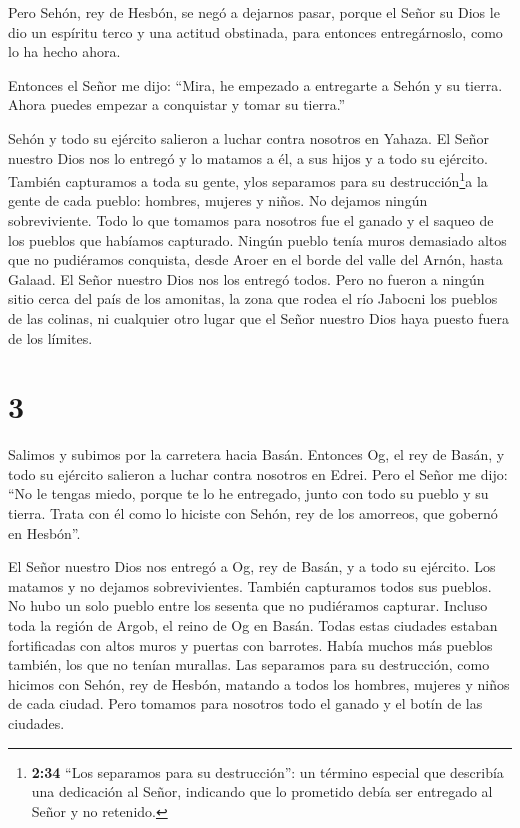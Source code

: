  Pero Sehón, rey de Hesbón, se negó a dejarnos pasar,
porque el Señor su Dios le dio un espíritu terco y una actitud
obstinada, para entonces entregárnoslo, como lo ha hecho ahora.

 Entonces el Señor me dijo: ``Mira, he empezado a
entregarte a Sehón y su tierra. Ahora puedes empezar a conquistar y
tomar su tierra.''

 Sehón y todo su ejército salieron a luchar contra nosotros
en Yahaza.  El Señor nuestro Dios nos lo entregó y lo
matamos a él, a sus hijos y a todo su ejército.  También
capturamos a toda su gente, ylos separamos para su
destrucción\footnote{\textbf{2:34} ``Los separamos para su
  destrucción'': un término especial que describía una dedicación al
  Señor, indicando que lo prometido debía ser entregado al Señor y no
  retenido.}a la gente de cada pueblo: hombres, mujeres y niños. No
dejamos ningún sobreviviente.  Todo lo que tomamos para
nosotros fue el ganado y el saqueo de los pueblos que habíamos
capturado.  Ningún pueblo tenía muros demasiado altos que
no pudiéramos conquista, desde Aroer en el borde del valle del Arnón,
hasta Galaad. El Señor nuestro Dios nos los entregó todos. 
Pero no fueron a ningún sitio cerca del país de los amonitas, la zona
que rodea el río Jabocni los pueblos de las colinas, ni cualquier otro
lugar que el Señor nuestro Dios haya puesto fuera de los límites.

\hypertarget{section-2}{%
\section{3}\label{section-2}}

 Salimos y subimos por la carretera hacia Basán. Entonces
Og, el rey de Basán, y todo su ejército salieron a luchar contra
nosotros en Edrei.  Pero el Señor me dijo: ``No le tengas
miedo, porque te lo he entregado, junto con todo su pueblo y su tierra.
Trata con él como lo hiciste con Sehón, rey de los amorreos, que gobernó
en Hesbón''.

 El Señor nuestro Dios nos entregó a Og, rey de Basán, y a
todo su ejército. Los matamos y no dejamos sobrevivientes. 
También capturamos todos sus pueblos. No hubo un solo pueblo entre los
sesenta que no pudiéramos capturar. Incluso toda la región de Argob, el
reino de Og en Basán.  Todas estas ciudades estaban
fortificadas con altos muros y puertas con barrotes. Había muchos más
pueblos también, los que no tenían murallas.  Las separamos
para su destrucción, como hicimos con Sehón, rey de Hesbón, matando a
todos los hombres, mujeres y niños de cada ciudad.  Pero
tomamos para nosotros todo el ganado y el botín de las ciudades.

